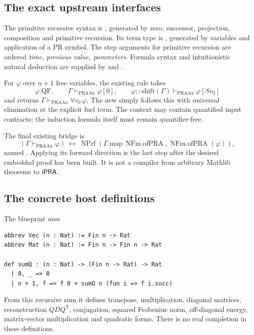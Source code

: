 \subsection{The exact upstream interfaces}

The primitive recursive syntax is , generated by zero, successor, projection, composition and primitive recursion. Its term type is , generated by variables and application of a PR symbol. The step arguments for primitive recursion are ordered \emph{time, previous value, parameters}. Formula syntax and intuitionistic natural deduction are supplied by  and  \cite{prsource,deductionsource}.

For $\varphi$ over $n+1$ free variables, the existing rule  takes
\[
 \varphi.\mathrm{QF},\qquad
 \Gamma\vdash_{\mathrm{PRAAx}}\varphi[0],\qquad
 \varphi::\mathrm{shift}(\Gamma)\vdash_{\mathrm{PRAAx}}\varphi[Sv_0]
\]
and returns $\Gamma\vdash_{\mathrm{PRAAx}}\forall v_0\,\varphi$.
The new  simply follows this with universal elimination at the explicit fuel term. The context may contain quantified input contracts; the induction formula itself must remain quantifier-free.

The final existing bridge is
\[
 (\Gamma\vdash_{\mathrm{PRAAx}}\varphi)
 \ \longleftrightarrow\
 \operatorname{NPrf}(\Gamma.\mathrm{map}\,\operatorname{NFm.ofPRA},
                            \operatorname{NFm.ofPRA}(\varphi)),
\]
named  \cite{nativesource}. Applying its forward direction is the last step after the desired embedded proof has been built. It is not a compiler from arbitrary Mathlib theorems to $\mathsf{iPRA}$.

\subsection{The concrete host definitions}

The blueprint uses
\begin{lstlisting}
abbrev Vec (n : Nat) := Fin n -> Rat
abbrev Mat (n : Nat) := Fin n -> Fin n -> Rat

def sumQ : (n : Nat) -> (Fin n -> Rat) -> Rat
  | 0, _ => 0
  | n + 1, f => f 0 + sumQ n (fun i => f i.succ)
\end{lstlisting}
From this recursive sum it defines transpose, multiplication, diagonal matrices, reconstruction $QDQ^{\mathsf T}$, conjugation, squared Frobenius norm, off-diagonal energy, matrix-vector multiplication and quadratic forms. There is no real completion in these definitions.

